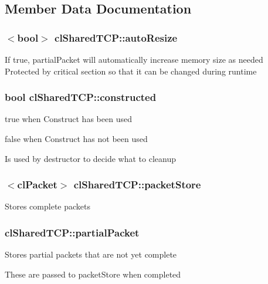 \subsection{Member Data Documentation}
\hypertarget{classcl_shared_t_c_p_aadfbe0c28871af737963ac9205a71a6c}{
\subsubsection[{autoResize}]{$<$bool$>$ {\bf clSharedTCP::autoResize}}}
\label{classcl_shared_t_c_p_aadfbe0c28871af737963ac9205a71a6c}
If true, partialPacket will automatically increase memory size as needed Protected by critical section so that it can be changed during runtime \hypertarget{classcl_shared_t_c_p_a2f584a19a4ba7d93b3a2e3467840c674}{
\subsubsection[{constructed}]{\setlength{\rightskip}{0pt plus 5cm}bool {\bf clSharedTCP::constructed}}}
\label{classcl_shared_t_c_p_a2f584a19a4ba7d93b3a2e3467840c674}
true when {\ttfamily Construct} has been used \par
 false when {\ttfamily Construct} has not been used \par
 Is used by destructor to decide what to cleanup \par
 \hypertarget{classcl_shared_t_c_p_a4f9fa934fb8217556dde5f5da38d76af}{
\subsubsection[{packetStore}]{$<${\bf clPacket}$>$ {\bf clSharedTCP::packetStore}}}
\label{classcl_shared_t_c_p_a4f9fa934fb8217556dde5f5da38d76af}
Stores complete packets \hypertarget{classcl_shared_t_c_p_a5bff66a18a60aa4260c87d1e3dbf9658}{
\subsubsection[{partialPacket}]{ {\bf clSharedTCP::partialPacket}}}
\label{classcl_shared_t_c_p_a5bff66a18a60aa4260c87d1e3dbf9658}
Stores partial packets that are not yet complete \par
 These are passed to packetStore when completed 

